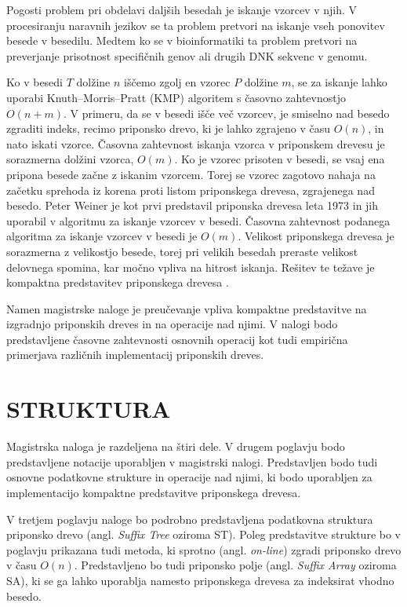 Pogosti problem pri obdelavi daljših besedah je iskanje vzorcev v njih. V procesiranju naravnih jezikov se ta problem pretvori na iskanje vseh ponovitev besede v besedilu. Medtem ko se v bioinformatiki ta problem pretvori na preverjanje prisotnost specifičnih genov ali drugih DNK sekvenc v genomu. 

Ko v besedi $T$ dolžine $n$ iščemo zgolj en vzorec $P$ dolžine $m$, se za iskanje lahko uporabi Knuth–Morris–Pratt (KMP) algoritem s časovno zahtevnostjo $O(n+m)$.  V primeru, da se v besedi išče več vzorcev, je smiselno nad besedo zgraditi indeks, recimo priponsko drevo, ki je lahko zgrajeno v času $O(n)$, in nato iskati vzorce. Časovna zahtevnost iskanja vzorca v priponskem drevesu je sorazmerna dolžini vzorca, $O(m)$. Ko je vzorec prisoten v besedi, se vsaj ena pripona besede začne z iskanim vzorcem. 
Torej se vzorec zagotovo nahaja na začetku sprehoda iz korena proti listom priponskega drevesa, zgrajenega nad besedo. 
Peter Weiner je kot prvi predstavil priponska drevesa leta 1973 \cite{Weiner1973} in jih uporabil v algoritmu za iskanje vzorcev v besedi. Časovna zahtevnost podanega algoritma za iskanje vzorcev v besedi je $O(m)$. Velikost priponskega drevesa je sorazmerna z velikostjo besede, torej pri velikih besedah preraste velikost delovnega spomina, kar močno vpliva na hitrost iskanja. Rešitev te težave je kompaktna predstavitev priponskega drevesa \cite{Navarro2016}.

Namen magistrske naloge je preučevanje vpliva kompaktne predstavitve na izgradnjo priponskih dreves in na operacije nad njimi. V nalogi bodo predstavljene  časovne zahtevnosti osnovnih operacij kot tudi empirična primerjava različnih implementacij priponskih dreves.

\section{STRUKTURA}\label{sec:struktura}

Magistrska naloga je razdeljena na štiri dele. V drugem poglavju bodo predstavljene notacije uporabljen v magistrski nalogi. Predstavljen bodo tudi osnovne podatkovne strukture in operacije nad njimi, ki bodo uporabljen za implementacijo kompaktne predstavitve priponskega drevesa.

V tretjem poglavju naloge bo podrobno predstavljena podatkovna struktura priponsko drevo (angl. \textit{Suffix Tree} oziroma ST). Poleg predstavitve strukture bo v poglavju prikazana tudi metoda, ki sprotno (angl. \textit{on-line}) zgradi priponsko drevo v času $O(n)$. Predstavljeno bo tudi priponsko polje (angl. \textit{Suffix Array} oziroma SA), ki se ga lahko uporablja namesto priponskega drevesa za indeksirat vhodno besedo.

